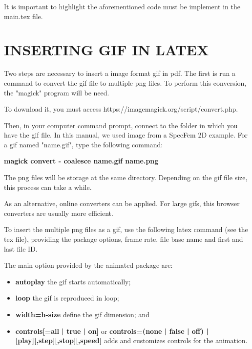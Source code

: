 \lstset{style=mystyle}

It is important to highlight the aforementioned code must be implement in the main.tex file. 



\section{INSERTING GIF IN LATEX}

Two steps are necessary to insert a image format gif in pdf. The first is run a command to convert the gif file to multiple png files. To perform this conversion, the "magick" program will be need. 

To download it, you must access https://imagemagick.org/script/convert.php.

Then, in your computer command prompt, connect to the folder in which you have the gif file. In this manual, we used image from a SpecFem 2D example. For a gif named "name.gif", type the following command:

\textbf{magick convert - coalesce name.gif name.png}

The png files will be storage at the same directory. Depending on the gif file size, this process can take a while.

As an alternative, online converters can be applied. For large gifs, this browser converters are usually more efficient.

To insert the multiple png files as a gif, use the following latex command (see the tex file), providing the package options, frame rate, file base name and first and last file ID.

\noindent{}

The main option provided by the animated package are:

\begin{itemize}
	\item \textbf{autoplay} the gif starts automatically;
	\item \textbf{loop} the gif is reproduced in loop;
	\item \textbf{width=h-size} define the gif dimension; and
	\item \textbf{controls[=all | true | on]} or \textbf{controls=(none | false | off) |} \\ \textbf{{[play][,step][,stop][,speed]}} adds and customizes controls for the animation.
\end{itemize}











